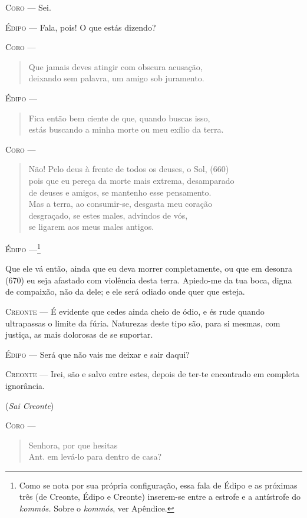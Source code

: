 \textsc{Coro} --- Sei.

\textsc{Édipo} --- Fala, pois! O que estás dizendo?

\textsc{Coro} --- \begin{verse}Que jamais deves atingir com obscura acusação,\\
deixando sem palavra, um amigo sob juramento.
\end{verse}

\textsc{Édipo} --- \begin{verse}Fica então bem ciente de que, quando buscas isso,\\
estás buscando a minha morte ou meu exílio da terra.
\end{verse}

\textsc{Coro} --- \begin{verse}Não! Pelo deus à frente de todos os deuses, o Sol, (660)\\
pois que eu pereça da morte mais extrema, desamparado\\
de deuses e amigos, se mantenho esse pensamento.\\
Mas a terra, ao consumir-se, desgasta meu coração\\
desgraçado, se estes males, advindos de vós,\\
se ligarem aos meus males antigos.
\end{verse}

\textsc{Édipo} ---\footnote{Como se nota por sua própria configuração, essa
  fala de Édipo e as próximas três (de Creonte, Édipo e Creonte)
  inserem-se entre a estrofe e a antístrofe do \emph{kommós.} Sobre o
  \emph{kommós}, ver Apêndice.}

Que ele vá então, ainda que eu deva morrer completamente, ou que em
desonra (670) eu seja afastado com violência desta terra. Apiedo-me da
tua boca, digna de compaixão, não da dele; e ele será odiado onde quer
que esteja.

\textsc{Creonte} --- É evidente que cedes ainda cheio de ódio, e és rude quando ultrapassas o
limite da fúria. Naturezas deste tipo são, para si mesmas, com justiça,
as mais dolorosas de se suportar.

\textsc{Édipo} --- Será que não vais me deixar e sair daqui?

\textsc{Creonte} --- Irei, são e salvo entre estes, depois de ter-te encontrado em completa
ignorância.

(\emph{Sai Creonte})

\textsc{Coro} --- \begin{verse}Senhora, por que hesitas\\ Ant.
em levá-lo para dentro de casa?
\end{verse}

